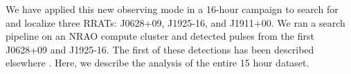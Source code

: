 We have applied this new observing mode in a 16-hour campaign to search for and localize three RRATs: J0628+09, J1925-16, and J1911+00. We ran a search pipeline on an NRAO compute cluster and detected pulses from the first J0628+09 and J1925-16. The first of these detections has been described elsewhere \citep{Law_2012}. Here, we describe the analysis of the entire 15 hour dataset.

  
  
  
  
  
  
  
  
  
  
  
  